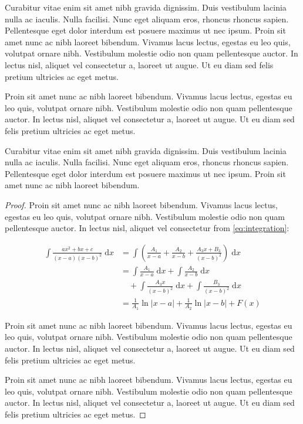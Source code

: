Curabitur vitae enim sit amet nibh gravida dignissim. Duis vestibulum lacinia nulla ac iaculis. Nulla facilisi. Nunc eget aliquam eros, rhoncus rhoncus sapien. Pellentesque eget dolor interdum est posuere maximus ut nec ipsum. Proin sit amet nunc ac nibh laoreet bibendum. Vivamus lacus lectus, egestas eu leo quis, volutpat ornare nibh. Vestibulum molestie odio non quam pellentesque auctor. In lectus nisl, aliquet vel consectetur a, laoreet ut augue. Ut eu diam sed felis pretium ultricies ac eget metus.

Proin sit amet nunc ac nibh laoreet bibendum. Vivamus lacus lectus, egestas eu leo quis, volutpat ornare nibh. Vestibulum molestie odio non quam pellentesque auctor. In lectus nisl, aliquet vel consectetur a, laoreet ut augue. Ut eu diam sed felis pretium ultricies ac eget metus.

\begin{theorem}
Curabitur vitae enim sit amet nibh gravida dignissim. Duis vestibulum lacinia nulla ac iaculis. Nulla facilisi. Nunc eget aliquam eros, rhoncus rhoncus sapien. Pellentesque eget dolor interdum est posuere maximus ut nec ipsum. Proin sit amet nunc ac nibh laoreet bibendum.	
\end{theorem}

\begin{proof}
Proin sit amet nunc ac nibh laoreet bibendum. Vivamus lacus lectus, egestas eu leo quis, volutpat ornare nibh. Vestibulum molestie odio non quam pellentesque auctor. In lectus nisl, aliquet vel consectetur from \eqref{eq:integration}:

\begin{align}
\int \frac{ax^2+bx+c}{(x-a)(x-b)^2} \;\mathrm{d}x
& = \int \left( \frac{A_1}{x-a} + \frac{A_2}{x-b} + \frac{A_3x+B_3}{(x-b)^2} \right) \;\mathrm{d}x
\\ \nonumber
& = \int \frac{A_1}{x-a} \;\mathrm{d}x + \int \frac{A_2}{x-b} \;\mathrm{d}x 
\\
& \quad + \int \frac{A_3x}{(x-b)^2} \;\mathrm{d}x + \int \frac{B_3}{(x-b)^2} \;\mathrm{d}x
\\
& = \frac{1}{A_1} \ln \lvert x-a \rvert + \frac{1}{A_2}\ln \lvert x-b \rvert + F(x)
\end{align}

Proin sit amet nunc ac nibh laoreet bibendum. Vivamus lacus lectus, egestas eu leo quis, volutpat ornare nibh. Vestibulum molestie odio non quam pellentesque auctor. In lectus nisl, aliquet vel consectetur a, laoreet ut augue. Ut eu diam sed felis pretium ultricies ac eget metus.

Proin sit amet nunc ac nibh laoreet bibendum. Vivamus lacus lectus, egestas eu leo quis, volutpat ornare nibh. Vestibulum molestie odio non quam pellentesque auctor. In lectus nisl, aliquet vel consectetur a, laoreet ut augue. Ut eu diam sed felis pretium ultricies ac eget metus.
\end{proof}

